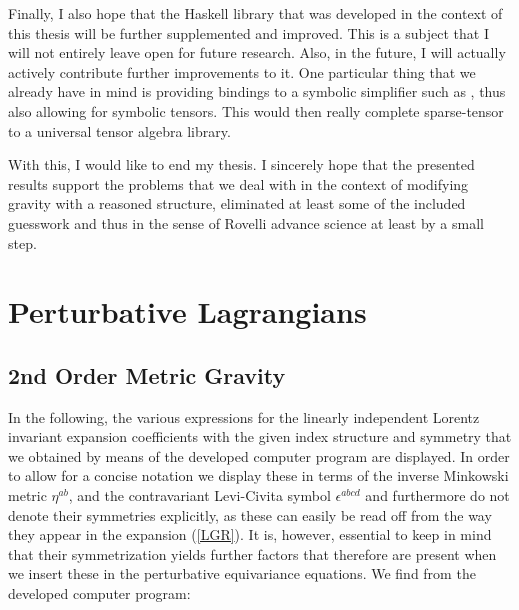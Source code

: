 \documentclass[a4paper,12pt, DIV=14, BCOR=5mm, twoside, headsepline, numbers=noenddot]{scrbook}
\begin{document}
Finally, I also hope that the Haskell library that was developed in the context of this thesis will be further supplemented and improved. This is a subject that I will not entirely leave open for future research. Also, in the future, I will actually actively contribute further improvements to it. One particular thing that we already have in mind is providing bindings to a symbolic simplifier such as \cite{SymPy}, thus also allowing for symbolic tensors. This would then really complete sparse-tensor to a universal tensor algebra library.

With this, I would like to end my thesis. I sincerely hope that the presented results support the problems that we deal with in the context of modifying gravity with a reasoned structure, eliminated at least some of the included guesswork and thus in the sense of Rovelli advance science at least by a small step.

\appendix

\chapter{Perturbative Lagrangians}
\section{2nd Order Metric Gravity}\label{AppGR}
In the following, the various expressions for the linearly independent Lorentz invariant expansion coefficients with the given index structure and symmetry that we obtained by means of the developed computer program are displayed. In order to allow for a concise notation we display these in terms of the inverse Minkowski metric $\eta^{ab}$, and the contravariant Levi-Civita symbol $\epsilon^{abcd}$ and furthermore do not denote their symmetries explicitly, as these can easily be read off from the way they appear in the expansion (\ref{LGR}). It is, however, essential to keep in mind that their symmetrization yields further factors that therefore are present when we insert these in the perturbative equivariance equations. We find from the developed computer program:\\
\end{document}
